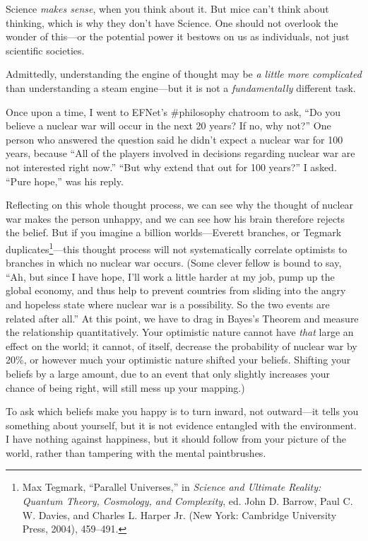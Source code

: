 {
 Science \textit{makes sense}, when you think about it. But mice
can't think about thinking, which is why they
don't have Science. One should not overlook the wonder
of this---or the potential power it bestows on us as individuals, not
just scientific societies.}

{
 Admittedly, understanding the engine of thought may be \textit{a
little more complicated} than understanding a steam engine---but it is
not a \textit{fundamentally} different task.}

{
 Once upon a time, I went to EFNet's \#philosophy
chatroom to ask, ``Do you believe a nuclear war will
occur in the next 20 years? If no, why not?'' One
person who answered the question said he didn't expect
a nuclear war for 100 years, because ``All of the
players involved in decisions regarding nuclear war are not interested
right now.'' ``But why extend that
out for 100 years?'' I asked. ``Pure
hope,'' was his reply.}

{
 Reflecting on this whole thought process, we can see why the
thought of nuclear war makes the person unhappy, and we can see how his
brain therefore rejects the belief. But if you imagine a billion
worlds---Everett branches, or Tegmark
duplicates\footnote{Max Tegmark, ``Parallel
Universes,'' in \textit{Science and Ultimate Reality:
Quantum Theory, Cosmology, and Complexity}, ed. John D. Barrow, Paul C.
W. Davies, and Charles L. Harper Jr. (New York: Cambridge University
Press, 2004), 459--491.}{}---this thought process will not
systematically correlate optimists to branches in which no nuclear war
occurs. (Some clever fellow is bound to say, ``Ah, but
since I have hope, I'll work a little harder at my job,
pump up the global economy, and thus help to prevent countries from
sliding into the angry and hopeless state where nuclear war is a
possibility. So the two events are related after
all.'' At this point, we have to drag in
Bayes's Theorem and measure the relationship
quantitatively. Your optimistic nature cannot have \textit{that} large
an effect on the world; it cannot, of itself, decrease the probability
of nuclear war by 20\%, or however much your optimistic nature shifted
your beliefs. Shifting your beliefs by a large amount, due to an event
that only slightly increases your chance of being right, will still
mess up your mapping.)}

{
 To ask which beliefs make you happy is to turn inward, not
outward---it tells you something about yourself, but it is not evidence
entangled with the environment. I have nothing against happiness, but
it should follow from your picture of the world, rather than tampering
with the mental paintbrushes.}


